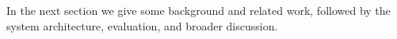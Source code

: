 \vspace{0.08in}

In the next section we give some background and related work, followed by the system architecture, evaluation, and 
broader discussion.






